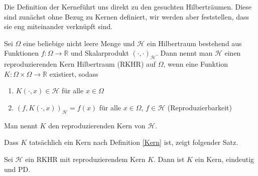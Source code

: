 Die Definition der Kerneführt uns direkt zu den gesuchten Hilberträumen. Diese sind zunächst ohne Bezug zu Kernen definiert, wir werden aber feststellen, dass sie eng miteinander verknüpft sind.

\begin{definition}
Sei $\Omega$ eine beliebige nicht leere Menge und $\mathcal{H}$ ein Hilbertraum bestehend aus Funktionen $f:\Omega \rightarrow \mathbb{R}$ und Skalarprodukt $(\cdot, \cdot)_\mathcal{H}$. Dann nennt man $\mathcal{H}$ einen reproduzierenden Kern Hilbertraum (\acs{RKHR}) auf $\Omega$, wenn eine Funktion $K:\Omega \times \Omega \rightarrow \mathbb{R}$ existiert, sodass
\begin{enumerate}
\item $K(\cdot, x) \in \mathcal{H}$ für alle $x \in \Omega$
\item $(f, K(\cdot,x))_\mathcal{H} = f(x)$ für alle $ x \in \Omega$, $f \in \mathcal{H}$ (Reproduzierbarkeit)
\end{enumerate}
Man nennt $K$ den reproduzierenden Kern von $\mathcal{H}$.
\end{definition}

Dass $K$ tatsächlich ein Kern nach Definition \ref{Kern} ist, zeigt folgender Satz.
\begin{theorem}
\label{thm:EindeutigkeitKern}
Sei $\mathcal{H}$ ein \gls{RKHR} mit reproduzierendem Kern $K$. Dann ist $K$ ein Kern, eindeutig und \ac{PD}.
\end{theorem}

